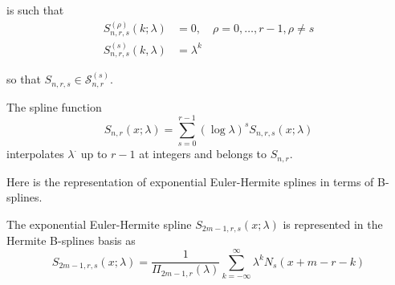 \documentclass[a4paper, 11pt]{article}
\begin{document}
is such that
\begin{align*}
  S_{n,r,s}^{(\rho)}(k;\lambda)  &= 0, \quad \rho=0, \ldots, r-1, \rho \neq s \\
  S_{n,r,s}^{(s)}(k, \lambda) &= \lambda^k
\end{align*}

so that $S_{n,r,s} \in \mathcal{S}_{n,r}^{(s)}$. 

\begin{thm}{2.1}
  The spline function 
  \begin{equation*}
    S_{n,r}(x;\lambda) = \sum_{s=0}^{r-1} {(\log \lambda)}^s S_{n,r,s}(x;\lambda)
  \end{equation*}
  interpolates $\lambda^{\cdot}$ up to $r-1$ at integers and belongs to $S_{n,r}$.
\end{thm}

Here is the representation of exponential Euler-Hermite splines in terms of B-splines.
\begin{thm}{3.1}
  The exponential Euler-Hermite spline $S_{2m-1, r, s}(x;\lambda)$ is represented in the Hermite B-splines basis as
  \begin{equation*}
    S_{2m-1,r,s}(x;\lambda) = \frac{1}{\Pi_{2m-1,r}(\lambda)} \sum_{k=-\infty}^{\infty} \lambda^k N_s(x+m-r-k)
  \end{equation*}
\end{thm}


\nocite{*}
\printbibliography%
\end{document}
